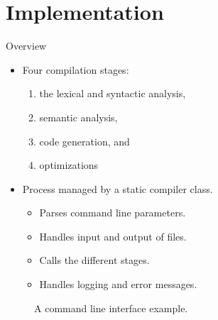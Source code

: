 \section{Implementation}
\begin{frame}{Overview}
    \begin{itemize}
        \item Four compilation stages:
        \begin{enumerate}
            \item the lexical and syntactic analysis,
            \item semantic analysis,
            \item code generation, and %
            \item optimizations
        \end{enumerate}
        \item Process managed by a static compiler class.
        \begin{itemize}
            \item Parses command line parameters.
            \item Handles input and output of files.
            \item Calls the different stages.
            \item Handles logging and error messages.
        \end{itemize}
    \end{itemize}    
    \begin{figure}[htp]
        \centering     
        
        \caption{A command line interface example.}
    \end{figure}
\end{frame}

